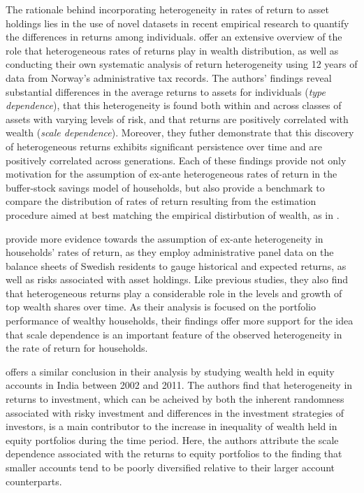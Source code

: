 \documentclass[\econtexRoot/Chp1]{subfiles}
\begin{document}
\par The rationale behind incorporating heterogeneity in rates of return to asset holdings lies in the use of novel datasets in recent empirical research to quantify the differences in returns among individuals. \cite{aflgdmlp20} offer an extensive overview of the role that heterogeneous rates of returns play in wealth distribution, as well as conducting their own systematic analysis of return heterogeneity using 12 years of data from Norway's administrative tax records. The authors' findings reveal substantial differences in the average returns to assets for individuals (\textit{type dependence}), that this heterogeneity is found both within and across classes of assets with varying levels of risk, and that returns are positively correlated with wealth  (\textit{scale dependence}). Moreover, they futher demonstrate that this discovery of heterogeneous returns exhibits significant persistence over time and are positively correlated across generations. Each of these findings provide not only motivation for the assumption of ex-ante heterogeneous rates of return in the buffer-stock savings model of households, but also provide a benchmark to compare the distribution of rates of return resulting from the estimation procedure aimed at best matching the empirical distirbution of wealth, as in \cite{cstw2017}. 

\par \cite{lblcps18} provide more evidence towards the assumption of ex-ante heterogeneity in households' rates of return, as they employ administrative panel data on the balance sheets of Swedish residents to gauge historical and expected returns, as well as risks associated with asset holdings. Like previous studies, they also find that heterogeneous returns play a considerable role in the levels and growth of top wealth shares over time. As their analysis is focused on the portfolio performance of wealthy households, their findings offer more support for the idea that scale dependence is an important feature of the observed heterogeneity in the rate of return for households.

\par \cite{Campbell2019} offers a similar conclusion in their analysis by studying wealth held in equity accounts in India between 2002 and 2011. The authors find that heterogeneity in returns to investment, which can be acheived by both the inherent randomness associated with risky investment and differences in the investment strategies of investors, is a main contributor to the increase in inequality of wealth held in equity portfolios during the time period. Here, the authors attribute the scale dependence associated with the returns to equity portfolios to the finding that smaller accounts tend to be poorly diversified relative to their larger account counterparts. 
\end{document}
